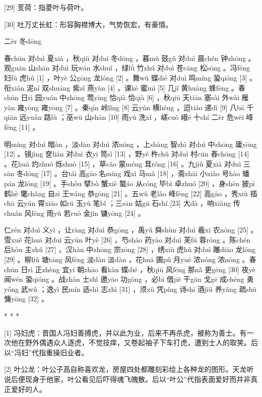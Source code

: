 \documentclass[12pt,UTF8]{ctexbook}
\begin{document}
[29] 芰荷：指菱叶与荷叶。

[30] 吐万丈长虹：形容胸襟博大，气势恢宏，有豪情。





二èr 冬dōng


春chūn 对duì 夏xià ，秋qiū 对duì 冬dōng ，暮mù 鼓gǔ 对duì 晨chén 钟zhōng 。观guān 山shān 对duì 玩wán 水shuǐ ，绿lǜ 竹zhú 对duì 苍cāng 松sōng 。冯féng 妇fù 虎hǔ [1] ，叶yè 公gōng 龙lóng [2] 。舞wǔ 蝶dié 对duì 鸣míng 蛩qióng [3] 。衔xián 泥ní 双shuāng 紫zǐ 燕yàn [4] ，课kè 蜜mì [5] 几jǐ 黄huáng 蜂fēng 。春chūn 日rì 园yuán 中zhōng 莺yīng 恰qià 恰qià [6] ，秋qiū 天tiān 塞sài 外wài 雁yàn 雍yōng 雍yōng [7] 。秦qín 岭lǐng [8] 云yún 横héng ，迢tiáo 递dì [9] 八bā 千qiān 远yuǎn 路lù ；巫wū 山shān [10] 雨yǔ 洗xǐ ，嵯cuó 峨é 十shí 二èr 危wēi 峰fēng [11] 。

明míng 对duì 暗àn ，淡dàn 对duì 浓nóng ，上shàng 智zhì 对duì 中zhōng 庸yōng [12] 。镜jìng 奁lián 对duì 衣yī 笥sì [13] ，野yě 杵chǔ 对duì 村cūn 舂chōng [14] 。花huā 灼zhuó 烁shuò [15] ，草cǎo 蒙méng 茸róng [16] 。九jiǔ 夏xià 对duì 三sān 冬dōng [17] 。台tái 高gāo 名míng 戏xì 马mǎ [18] ，斋zhāi 小xiǎo 号hào 蟠pán 龙lóng [19] 。手shǒu 擘bò 蟹xiè 螯áo 从cóng 毕bì 卓zhuó [20] ，身shēn 披pī 鹤hè 氅chǎng 自zì 王wáng 恭gōng [21] 。五wǔ 老lǎo 峰fēng [22] 高gāo ，秀xiù 插chā 云yún 霄xiāo 如rú 玉yù 笔bǐ ；三sān 姑gū 石shí [23] 大dà ，响xiǎng 传chuán 风fēng 雨yǔ 若ruò 金jīn 镛yōng [24] 。

仁rén 对duì 义yì ，让ràng 对duì 恭gōng ，禹yǔ 舜shùn 对duì 羲xī 农nóng [25] 。雪xuě 花huā 对duì 云yún 叶yè [26] ，芍sháo 药yào 对duì 芙fú 蓉róng 。陈chén 后hòu 主zhǔ [27] ，汉hàn 中zhōng 宗zōng [28] ，绣xiù 虎hǔ 对duì 雕diāo 龙lóng [29] 。柳liǔ 塘táng 风fēng 淡dàn 淡dàn ，花huā 圃pǔ 月yuè 浓nóng 浓nóng 。春chūn 日rì 正zhèng 宜yí 朝zhāo 看kàn 蝶dié ，秋qiū 风fēng 那nǎ 更gēng [30] 夜yè 闻wén 蛩qióng 。战zhàn 士shì 邀yāo 功gōng ，必bì 借jiè 干gān 戈gē 成chéng 勇yǒng 武wǔ ；逸yì 民mín 适shì 志zhì [31] ，须xū 凭píng 诗shī 酒jiǔ 养yǎng 疏shū 慵yōng [32] 。



* * *



[1] 冯妇虎：晋国人冯妇善搏虎，并以此为业，后来不再杀虎，被称为善士。有一次他在野外偶遇众人逐虎，不觉技痒，又卷起袖子下车打虎，遭到士人的取笑。后以“冯妇”代指重操旧业者。

[2] 叶公龙：叶公子高自称喜欢龙，房屋四处都雕刻彩绘上各种龙的图形。天龙听说后便现身于他家，叶公看见后吓得魂飞魄散。后以“叶公”代指表面爱好而并非真正爱好的人。
\end{document}
